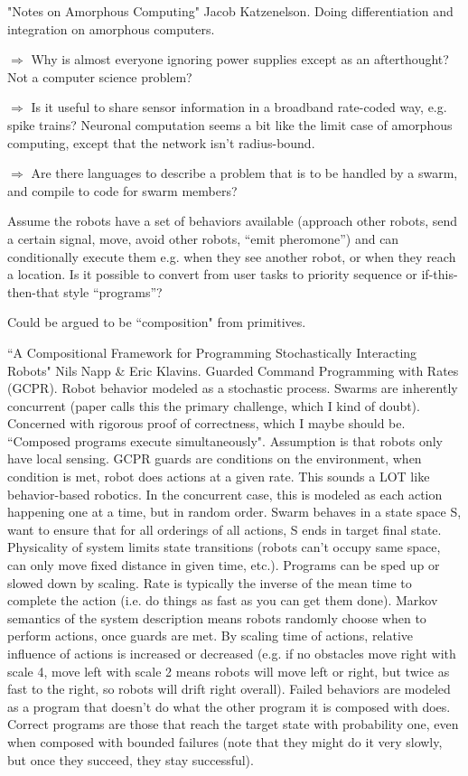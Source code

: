 \documentclass[]{article}
\begin{document}
"Notes on Amorphous Computing" Jacob Katzenelson. \cite{katzenelson2000notes} Doing differentiation and integration on amorphous computers. 

$\Rightarrow$ Why is almost everyone ignoring power supplies except as an afterthought? Not a computer science problem?

$\Rightarrow$ Is it useful to share sensor information in a broadband rate-coded way, e.g. spike trains? Neuronal computation seems a bit like the limit case of amorphous computing, except that the network isn't radius-bound. 

$\Rightarrow$ Are there languages to describe a problem that is to be handled by a swarm, and compile to code for swarm members?

Assume the robots have a set of behaviors available (approach other robots, send a certain signal, move, avoid other robots, ``emit pheromone'') and can conditionally execute them e.g. when they see another robot, or when they reach a location. Is it possible to convert from user tasks to priority sequence or if-this-then-that style ``programs''?

Could be argued to be ``composition" from primitives.

``A Compositional Framework for Programming Stochastically Interacting Robots" \cite{napp2011compositional} Nils Napp \& Eric Klavins. Guarded Command Programming with Rates (GCPR). Robot behavior modeled as a stochastic process. Swarms are inherently concurrent (paper calls this the primary challenge, which I kind of doubt). Concerned with rigorous proof of correctness, which I maybe should be. ``Composed programs execute simultaneously". Assumption is that robots only have local sensing. GCPR guards are conditions on the environment, when condition is met, robot does actions at a given rate. This sounds a LOT like behavior-based robotics. In the concurrent case, this is modeled as each action happening one at a time, but in random order. Swarm behaves in a state space S, want to ensure that for all orderings of all actions, S ends in target final state. Physicality of system limits state transitions (robots can't occupy same space, can only move fixed distance in given time, etc.). Programs can be sped up or slowed down by scaling. Rate is typically the inverse of the mean time to complete the action (i.e. do things as fast as you can get them done). Markov semantics of the system description means robots randomly choose when to perform actions, once guards are met. By scaling time of actions, relative influence of actions is increased or decreased (e.g. if no obstacles move right with scale 4, move left with scale 2 means robots will move left or right, but twice as fast to the right, so robots will drift right overall). Failed behaviors are modeled as a program that doesn't do what the other program it is composed with does. Correct programs are those that reach the target state with probability one, even when composed with bounded failures (note that they might do it very slowly, but once they succeed, they stay successful).
\end{document}

